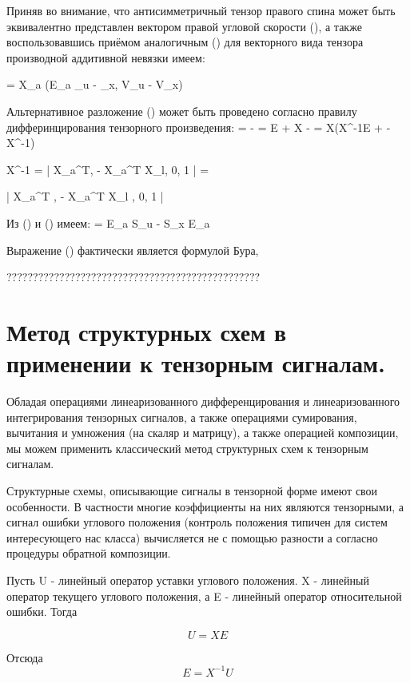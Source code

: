\documentclass[a4paper]{article}
\begin{document}
Приняв во внимание, что антисимметричный тензор правого спина может быть эквивалентно представлен вектором правой угловой скорости (), а также воспользовавшись приёмом аналогичным () для векторного вида тензора производной аддитивной невязки имеем:

 = X_a (E_a \Omega_u - \Omega_x, V_u - V_x)

Альтернативное разложение () может быть проведено согласно правилу дифферинцирования тензорного произведения:
 =  - = E + X - 
 = X(X^{-1}E +  - X^{-1})

X^{-1}  = 
| X_a^T,  - X_a^T X_l, 
	  0,            1 |  = 

| X_a^T ,  - X_a^T X_l , 
	  0,            1 |



Из () и () имеем:
 = E_a S_u - S_x E_a

Выражение () фактически является формулой Бура,  





????????????????????????????????????????????????
\section{Метод структурных схем в применении к тензорным сигналам.}
Обладая операциями линеаризованного дифференцирования и линеаризованного интегрирования тензорных сигналов, а также операциями сумирования, вычитания и умножения (на скаляр и матрицу), а также операцией композиции, мы можем применить классический метод структурных схем к тензорным сигналам.

Структурные схемы, описывающие сигналы в тензорной форме имеют свои особенности. В частности многие коэффициенты на них являются тензорными, а сигнал ошибки углового положения (контроль положения типичен для систем интересующего нас класса) вычисляется не с помощью разности а согласно процедуры обратной композиции.

Пусть U - линейный оператор уставки углового положения. X - линейный оператор текущего углового положения, а E - линейный оператор относительной ошибки. Тогда

\begin{equation}U = XE\end{equation}

Отсюда
\begin{equation}E = X^{-1}U\end{equation}
\end{document}
